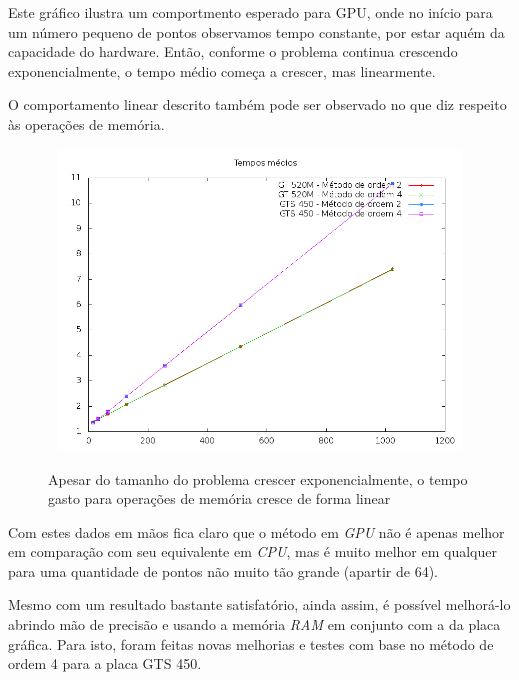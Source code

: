   Este gráfico ilustra um comportmento esperado para GPU, onde no início para um número pequeno de pontos observamos tempo constante, por estar aquém da capacidade do hardware. Então, conforme o problema continua crescendo exponencialmente, o tempo médio começa a crescer, mas linearmente.
  
  \newpage
  O comportamento linear descrito também pode ser observado no que diz respeito às operações de memória.
  
  \begin{figure}[!h]
    \begin{center}
       \includegraphics[width=120mm, height=80mm]{images/gpu-memo-means-double.png}
       \label{fig:gpu-memo-means-double}
       \caption{Apesar do tamanho do problema crescer exponencialmente, o tempo gasto para operações de memória cresce de forma linear}
    \end{center}
  \end{figure}
  
  Com estes dados em mãos fica claro que o método em \textit{GPU} não é apenas melhor em comparação com seu equivalente em \textit{CPU}, mas é muito melhor em qualquer para uma quantidade de pontos não muito tão grande (apartir de 64).
  
  Mesmo com um resultado bastante satisfatório, ainda assim, é possível melhorá-lo abrindo mão de precisão e usando a memória \textit{RAM} em conjunto com a da placa gráfica. Para isto, foram feitas novas melhorias e testes com base no método de ordem 4 para a placa GTS 450.

